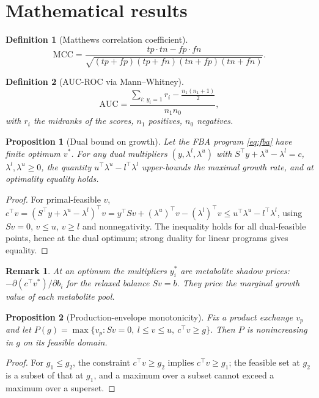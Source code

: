 \documentclass[12pt]{article}
\newtheorem{proposition}{Proposition}
\newtheorem{remark}{Remark}
\newtheorem{definition}{Definition}
\begin{document}
\section{Mathematical results}
\begin{definition}[Matthews correlation coefficient]
\begin{equation}
\mathrm{MCC} = \frac{tp\cdot tn - fp\cdot fn}
{\sqrt{(tp+fp)(tp+fn)(tn+fp)(tn+fn)}}. \label{eq:mcc}
\end{equation}
\end{definition}
\begin{definition}[AUC-ROC via Mann--Whitney]
\begin{equation}
\mathrm{AUC} = \frac{\sum_{i:\,y_i=1} r_i - \frac{n_1(n_1+1)}{2}}{n_1 n_0},
\label{eq:auc}
\end{equation}
with $r_i$ the midranks of the scores, $n_1$ positives, $n_0$ negatives.
\end{definition}

\begin{proposition}[Dual bound on growth]
Let the FBA program \eqref{eq:fba} have finite optimum $v^{*}$. For any
dual multipliers $(y,\lambda^{l},\lambda^{u})$ with
$S^{\top}y + \lambda^{u}-\lambda^{l} = c$, $\lambda^{l},\lambda^{u}\ge 0$,
the quantity $u^{\top}\lambda^{u} - l^{\top}\lambda^{l}$ upper-bounds the
maximal growth rate, and at optimality equality holds.
\end{proposition}
\begin{proof}
For primal-feasible $v$,
$c^{\top}v = (S^{\top}y+\lambda^{u}-\lambda^{l})^{\top}v
= y^{\top}Sv + (\lambda^{u})^{\top}v - (\lambda^{l})^{\top}v
\le u^{\top}\lambda^{u} - l^{\top}\lambda^{l}$,
using $Sv=0$, $v\le u$, $v\ge l$ and nonnegativity. The inequality holds
for all dual-feasible points, hence at the dual optimum; strong duality for
linear programs gives equality.
\end{proof}
\begin{remark}
At an optimum the multipliers $y^{*}_i$ are metabolite shadow prices:
$-\partial(c^{\top}v^{*})/\partial b_i$ for the relaxed balance $Sv=b$.
They price the marginal growth value of each metabolite pool.
\end{remark}

\begin{proposition}[Production-envelope monotonicity]
Fix a product exchange $v_p$ and let
$P(g)=\max\{v_p : Sv=0,\ l\le v\le u,\ c^{\top}v\ge g\}$.
Then $P$ is nonincreasing in $g$ on its feasible domain.
\end{proposition}
\begin{proof}
For $g_1\le g_2$, the constraint $c^{\top}v\ge g_2$ implies
$c^{\top}v\ge g_1$; the feasible set at $g_2$ is a subset of that at $g_1$,
and a maximum over a subset cannot exceed a maximum over a superset.
\end{proof}
\end{document}
